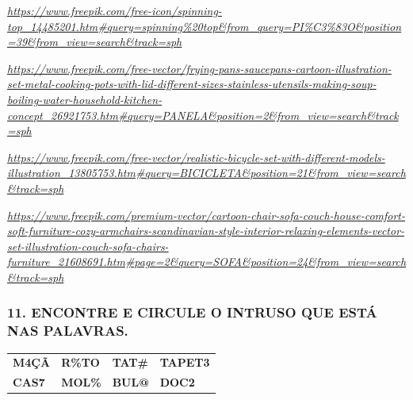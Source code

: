\href{https://www.freepik.com/free-icon/spinning-top_14485201.htm\#query=spinning\%20top\&from_query=PI\%C3\%83O\&position=39\&from_view=search\&track=sph}{\emph{https://www.freepik.com/free-icon/spinning-top\_14485201.htm\#query=spinning\%20top\&from\_query=PI\%C3\%83O\&position=39\&from\_view=search\&track=sph}}

\href{https://www.freepik.com/free-vector/frying-pans-saucepans-cartoon-illustration-set-metal-cooking-pots-with-lid-different-sizes-stainless-utensils-making-soup-boiling-water-household-kitchen-concept_26921753.htm\#query=PANELA\&position=2\&from_view=search\&track=sph}{\emph{https://www.freepik.com/free-vector/frying-pans-saucepans-cartoon-illustration-set-metal-cooking-pots-with-lid-different-sizes-stainless-utensils-making-soup-boiling-water-household-kitchen-concept\_26921753.htm\#query=PANELA\&position=2\&from\_view=search\&track=sph}}

\href{https://www.freepik.com/free-vector/realistic-bicycle-set-with-different-models-illustration_13805753.htm\#query=BICICLETA\&position=21\&from_view=search\&track=sph}{\emph{https://www.freepik.com/free-vector/realistic-bicycle-set-with-different-models-illustration\_13805753.htm\#query=BICICLETA\&position=21\&from\_view=search\&track=sph}}

\href{https://www.freepik.com/premium-vector/cartoon-chair-sofa-couch-house-comfort-soft-furniture-cozy-armchairs-scandinavian-style-interior-relaxing-elements-vector-set-illustration-couch-sofa-chairs-furniture_21608691.htm\#page=2\&query=SOFA\&position=24\&from_view=search\&track=sph}{\emph{https://www.freepik.com/premium-vector/cartoon-chair-sofa-couch-house-comfort-soft-furniture-cozy-armchairs-scandinavian-style-interior-relaxing-elements-vector-set-illustration-couch-sofa-chairs-furniture\_21608691.htm\#page=2\&query=SOFA\&position=24\&from\_view=search\&track=sph}}

\subsubsection{11. ENCONTRE E CIRCULE O INTRUSO QUE ESTÁ NAS
PALAVRAS.}\label{encontre-e-circule-o-intruso-que-estuxe1-nas-palavras.}

\begin{longtable}[]{@{}llll@{}}
\toprule
\textbf{M4ÇÃ} & \textbf{R\%TO} & \textbf{TAT\#} &
\textbf{TAPET3}\tabularnewline
\textbf{CAS7} & \textbf{MOL\%} & \textbf{BUL@} &
\textbf{DOC2}\tabularnewline
\bottomrule
\end{longtable}

